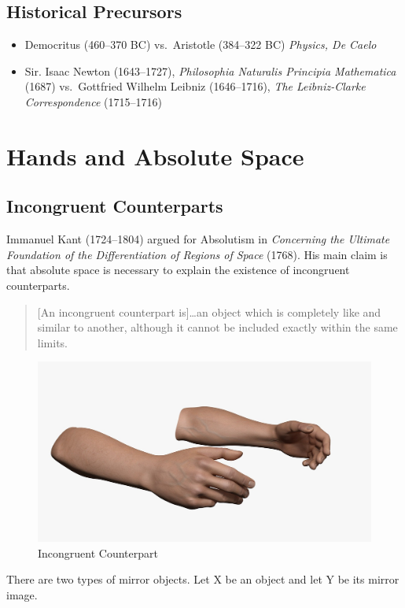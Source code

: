 \documentclass[oneside]{article}
\begin{document}
\subsection*{Historical Precursors}\label{historical-precursors}

\begin{itemize}
\item
  Democritus (460--370 BC) vs.~Aristotle (384--322 BC) \emph{Physics, De
  Caelo}
\item
  Sir. Isaac Newton (1643--1727), \emph{Philosophia Naturalis Principia
  Mathematica} (1687) vs.~Gottfried Wilhelm Leibniz (1646--1716),
  \emph{The Leibniz-Clarke Correspondence} (1715--1716)
\end{itemize}

\newpage

\section*{Hands and Absolute Space}

\subsection*{Incongruent Counterparts}\label{incongruent-counterparts}




Immanuel Kant (1724--1804) argued for Absolutism in \emph{Concerning the
Ultimate Foundation of the Differentiation of Regions of Space} (1768).
His main claim is that absolute space is necessary to explain the existence of
incongruent counterparts.



\begin{quote}
{[}An incongruent counterpart is{]}\ldots{}an object which is completely
like and similar to another, although it cannot be included exactly
within the same limits.
\end{quote}


\begin{figure}[h]
  \includegraphics[width=\linewidth]{hands.jpg}
  \caption{Incongruent Counterpart}
\end{figure}
There are two types of mirror objects. Let X be an object and let Y be
its mirror image.
\end{document}

